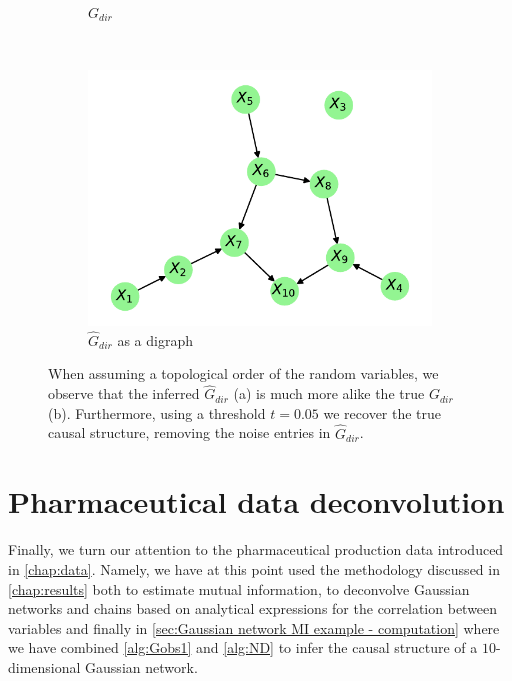 \documentclass[../Thesis.tex]{subfiles}
\begin{document}
\begin{figure}[H]
\begin{subfigure}[t]{0.49\linewidth}
        \caption{$G_{dir}$}
    \end{subfigure}
    \\[\baselineskip]
    \begin{subfigure}[t]{0.49\linewidth}
        \includegraphics[width = \linewidth]{figures/ND examples/Gaussian network 10 - G_dir as graph - triangular.pdf}
        \caption{$\hat{G}_{dir}$ as a digraph}
    \end{subfigure}
    \caption{When assuming a topological order of the random variables, we observe that the inferred $\hat{G}_{dir}$ (a) is much more alike the true $G_{dir}$ (b). Furthermore, using a threshold $t = 0.05$ we recover the true causal structure, removing the noise entries in $\hat{G}_{dir}$.}
    \label{fig:estimated MI 10 Gaussian results - triangular}
\end{figure}




\newpage
\section{Pharmaceutical data deconvolution}\label{sec:Results - pharmaceutical data}
Finally, we turn our attention to the pharmaceutical production data introduced in \autoref{chap:data}. Namely, we have at this point used the methodology discussed in \autoref{chap:results} both to estimate mutual information, to deconvolve Gaussian networks and chains based on analytical expressions for the correlation between variables and finally in \autoref{sec:Gaussian network MI example - computation} where we have combined \autoref{alg:Gobs1} and \autoref{alg:ND} to infer the causal structure of a $10$-dimensional Gaussian network.
\end{document}
